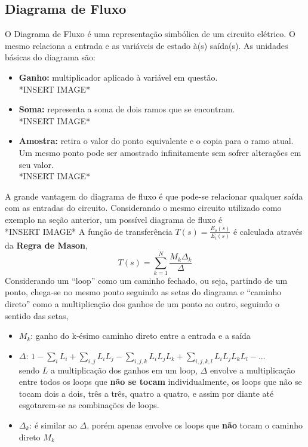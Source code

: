 \documentclass{article}
\numberwithin{equation}{section}
\begin{document}
    \subsection{Diagrama de Fluxo}
    \label{subsec:fluxo}
    O Diagrama de Fluxo é uma representação simbólica de um circuito elétrico. O mesmo relaciona a entrada e as variáveis de estado à(s) saída(s). As unidades básicas do diagrama são:
    \begin{itemize}
        \item \textbf{Ganho:} multiplicador aplicado à variável em questão. \\
        *INSERT IMAGE*
        \item \textbf{Soma:} representa a soma de dois ramos que se encontram. \\
        *INSERT IMAGE*
        \item \textbf{Amostra:} retira o valor do ponto equivalente e o copia para o ramo atual. Um mesmo ponto pode ser amostrado infinitamente sem sofrer alterações em seu valor. \\
        *INSERT IMAGE*
    \end{itemize}
    A grande vantagem do diagrama de fluxo é que pode-se relacionar qualquer saída com as entradas do circuito. Considerando o mesmo circuito utilizado como exemplo na seção anterior, um possível diagrama de fluxo é \\
    *INSERT IMAGE*
    A função de transferência $T(s)=\displaystyle{\frac{E_{o}(s)}{E_{i}(s)}}$ é calculada através da \textbf{Regra de Mason},
    $$T(s) = \sum_{k=1}^{N} \frac{M_{k}\Delta_{k}}{\Delta} $$
    Considerando um ``loop'' como um caminho fechado, ou seja, partindo de um ponto, chega-se no mesmo ponto seguindo as setas do diagrama e ``caminho direto'' como a multiplicação dos ganhos de um ponto ao outro, seguindo o sentido das setas,
    \begin{itemize}
        \item $M_{k}$: ganho do k-ésimo caminho direto entre a entrada e a saída
        \item $\Delta$: $1 - \displaystyle{\sum_{i}L_{i}} + \displaystyle{\sum_{i,j}L_{i}L_{j}} - \displaystyle{\sum_{i,j,k}L_{i}L_{j}L_{k}} + \displaystyle{\sum_{i,j,k,l}L_{i}L_{j}L_{k}L_{l}} - ...  $ \\ sendo $L$ a multiplicação dos ganhos em um loop, $\Delta$ envolve a multiplicação entre todos os loops que \textbf{não se tocam} individualmente, os loops que não se tocam dois a dois, três a três, quatro a quatro, e assim por diante até esgotarem-se as combinações de loops.
        \item $\Delta_{k}$: é similar ao $\Delta$, porém apenas envolve os loops que \textbf{não} tocam o caminho direto $M_{k}$
    \end{itemize}
\end{document}

